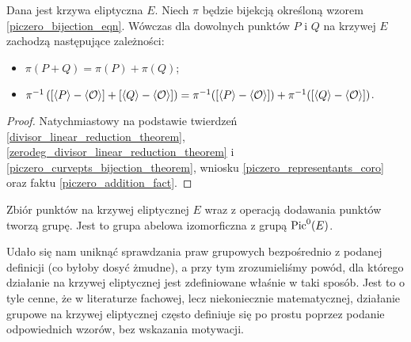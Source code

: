 \begin{theorem}
Dana jest krzywa eliptyczna $E$.
Niech $\pi$
będzie bijekcją określoną wzorem
\ref{piczero_bijection_eqn}.
Wówczas dla dowolnych punktów $P$ i $Q$ na krzywej $E$
zachodzą następujące zależności:
\begin{itemize}
\item $\pi(P + Q) = \pi(P) + \pi(Q)$;
\item
$\pi^{-1}\left(
[\left\langle P\right\rangle - \left\langle\mathcal{O}\right\rangle]
+
[\left\langle Q\right\rangle - \left\langle\mathcal{O}\right\rangle]\right
)
=
\pi^{-1}([\left\langle P\right\rangle - \left\langle\mathcal{O}\right\rangle])
+
\pi^{-1}([\left\langle Q\right\rangle - \left\langle\mathcal{O}\right\rangle])$.
\end{itemize}
\end{theorem}

\begin{proof}
Natychmiastowy na podstawie
twierdzeń
\ref{divisor_linear_reduction_theorem},
\ref{zerodeg_divisor_linear_reduction_theorem}
i \ref{piczero_curvepts_bijection_theorem},
wniosku \ref{piczero_representants_coro}
oraz faktu \ref{piczero_addition_fact}.
\end{proof}

\begin{corollary}
Zbiór punktów na krzywej eliptycznej $E$
wraz z operacją dodawania punktów
tworzą grupę.
Jest to grupa abelowa izomorficzna z grupą $\operatorname{Pic}^0(E)$.
\end{corollary}

\noindent
Udało się nam uniknąć sprawdzania praw grupowych
bezpośrednio z podanej definicji (co byłoby dosyć żmudne),
a przy tym zrozumieliśmy powód,
dla którego działanie na krzywej eliptycznej jest zdefiniowane
właśnie w taki sposób.
Jest to o tyle cenne,
że w literaturze fachowej, lecz niekoniecznie matematycznej,
działanie grupowe na krzywej eliptycznej
często definiuje się po prostu poprzez podanie odpowiednich wzorów,
bez wskazania motywacji.
